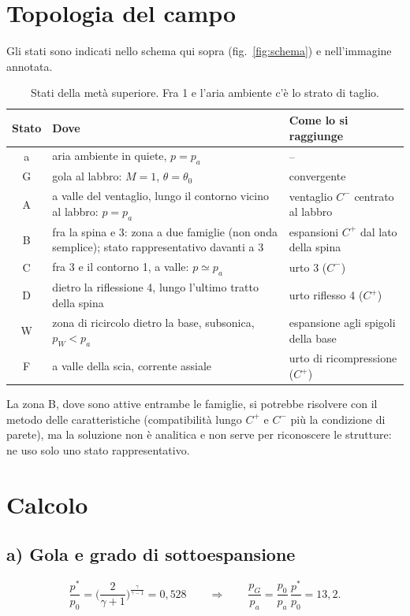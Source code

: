 \documentclass[11pt,a4paper]{article}
\newcommand{\Cp}{C^{+}}
\newcommand{\Cm}{C^{-}}
\begin{document}
\section{Topologia del campo}
Gli stati sono indicati nello schema qui sopra (fig.~\ref{fig:schema}) e nell'immagine annotata.
\begin{table}[H]
  \centering
  \small
  \begin{tabular}{cp{6.6cm}p{5.4cm}}
    \toprule
    Stato & Dove & Come lo si raggiunge \\
    \midrule
    a & aria ambiente in quiete, $p=p_a$ & -- \\
    G & gola al labbro: $M=1$, $\theta=\theta_0$ & convergente \\
    A & a valle del ventaglio, lungo il contorno vicino al labbro: $p=p_a$ & ventaglio $\Cm$ centrato al labbro \\
    B & fra la spina e 3: zona a due famiglie (non onda semplice); stato rappresentativo davanti a 3 & espansioni
    $\Cp$ dal lato della spina \\
    C & fra 3 e il contorno 1, a valle: $p\simeq p_a$ & urto 3 ($\Cm$) \\
    D & dietro la riflessione 4, lungo l'ultimo tratto della spina & urto riflesso 4 ($\Cp$) \\
    W & zona di ricircolo dietro la base, subsonica, $p_W<p_a$ & espansione agli spigoli della base \\
    F & a valle della scia, corrente assiale & urto di ricompressione ($\Cp$) \\
    \bottomrule
  \end{tabular}
  \caption{Stati della metà superiore. Fra 1 e l'aria ambiente c'è lo strato di taglio.}
\end{table}
La zona B, dove sono attive entrambe le famiglie, si potrebbe risolvere con il metodo delle caratteristiche
(compatibilità lungo $\Cp$ e $\Cm$ più la condizione di parete), ma la soluzione non è analitica e non serve per
riconoscere le strutture: ne uso solo uno stato rappresentativo.

\section{Calcolo}

\subsection*{a) Gola e grado di sottoespansione}
\[
\frac{p^*}{p_0}=\Big(\frac{2}{\gamma+1}\Big)^{\frac{\gamma}{\gamma-1}}=0{,}528
\qquad\Rightarrow\qquad \frac{p_G}{p_a}=\frac{p_0}{p_a}\,\frac{p^*}{p_0}=13{,}2 .
\]
\end{document}
